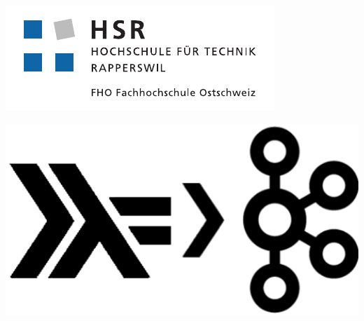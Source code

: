 \begin{titlepage}
\begin{flushleft}

\begin{center}
\begin{minipage}[t]{0.45\textwidth}
  \includegraphics[width=\textwidth]{images/hsr_logo.pdf}
\end{minipage}
\begin{minipage}[t]{0.45\textwidth}
 \includegraphics[width=\textwidth]{images/haskell_kafka_logo.pdf}
\end{minipage}
\end{center}
\noindent\begin{minipage}[t]{0.49\textwidth}
  \begin{flushleft}
    \vspace{0pt} %
  \end{flushleft}
\end{minipage}
\hfill
\begin{minipage}[t]{0.49\textwidth}
  \begin{flushright}
    \vspace{0pt} %
  \end{flushright}
\end{minipage}
\\[4cm]


\end{flushleft}
\end{titlepage}
